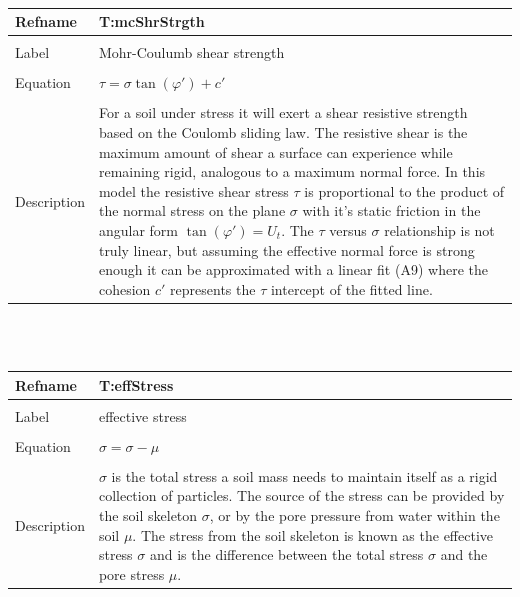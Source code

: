 \documentclass[12pt]{article}
\begin{document}
~\newline
\noindent \begin{minipage}{\textwidth}
\begin{tabular}{p{} p{}}
\toprule \textbf{Refname} & \textbf{T:mcShrStrgth}
\label{T:mcShrStrgth}
\\ \midrule \\
Label & Mohr-Coulumb shear strength
\\ \midrule \\
Equation & $\tau{}=\sigma{}\tan\left(\varphi{}'\right)+c'$
\\ \midrule \\
Description & For a soil under stress it will exert a shear resistive strength based on the Coulomb sliding law. The resistive shear is the maximum amount of shear a surface can experience while remaining rigid, analogous to a maximum normal force. In this model the resistive shear stress $\tau{}$ is proportional to the product of the normal stress on the plane $\sigma{}$ with it's static friction in the angular form $\tan\left(\varphi{}'\right)=U_{t}$. The $\tau{}$ versus $\sigma{}$ relationship is not truly linear, but assuming the effective normal force is strong enough it can be approximated with a linear fit (A9) where the cohesion $c'$ represents the $\tau{}$ intercept of the fitted line.
\\ \bottomrule \end{tabular}
\end{minipage}\\
~\newline
\noindent \begin{minipage}{\textwidth}
\begin{tabular}{p{} p{}}
\toprule \textbf{Refname} & \textbf{T:effStress}
\label{T:effStress}
\\ \midrule \\
Label & effective stress
\\ \midrule \\
Equation & $\sigma{}=\sigma{}-\mu{}$
\\ \midrule \\
Description & $\sigma{}$ is the total stress a soil mass needs to maintain itself as a rigid collection of particles. The source of the stress can be provided by the soil skeleton $\sigma{}$, or by the pore pressure from water within the soil $\mu{}$. The stress from the soil skeleton is known as the effective stress $\sigma{}$ and is the difference between the total stress $\sigma{}$ and the pore stress $\mu{}$.
\\ \bottomrule \end{tabular}
\end{minipage}\\
\end{document}
